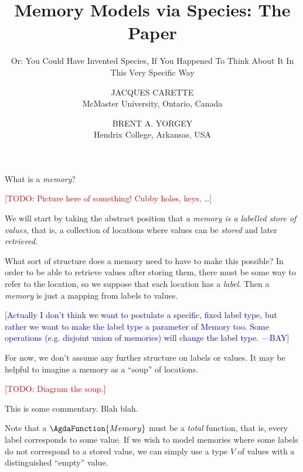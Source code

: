 \documentclass{jfp1}
\title{Memory Models via Species: The Paper}
\subtitle{Or: You Could Have Invented Species, If You Happened To Think
  About It In This Very Specific Way}
\author[J. Carette and B. A. Yorgey]{JACQUES CARETTE\\
  McMaster University, Ontario, Canada \\
  \email{carette@mcmaster.ca}
  \and BRENT A. YORGEY\\
  Hendrix College, Arkansas, USA\\
  \email{yorgey@hendrix.edu}}
\newcommand{\term}[1]{\emph{#1}}
\newcommand{\authornote}[3]{\textcolor{#1}{[#3 ---#2]}}
\newcommand{\todo}[1]{\textcolor{red}{[TODO: #1]}}
\newcommand{\authornote}[3]{}
\newcommand{\todo}[1]{}
\newcommand{\bay}[1]{\authornote{blue}{BAY}{#1}}
\begin{document}
\maketitle

What is a \term{memory}?

\todo{Picture here of something! Cubby holes, keys, \dots}

We will start by taking the abstract position that \emph{a memory is a
 labelled store of values}, that is, a collection of locations where values 
can be \emph{stored} and later \emph{retrieved}.

What sort of structure does a memory need to have to make this
possible?  In order to be able to retrieve values after storing them,
there must be some way to refer to the location, so we
suppose that each location has a \emph{label}.  Then a \term{memory}
is just a mapping from labels to values.


\bay{Actually I don't think we want to postulate a specific, fixed
  label type, but rather we want to make the label type a parameter of
  Memory too.  Some operations (e.g. disjoint union of memories) will
  change the label type.}

For now, we don't assume any further structure on labels or values.
It may be helpful to imagine a memory as a ``soup'' of locations.

\todo{Diagram the soup.}

\begin{commentary}
  This is some commentary.  Blah blah.
\end{commentary}

Note that a $\AgdaFunction{Memory}$ must be a \emph{total} function,
that is, every label corresponds to some value.  If we wish to model
memories where some labels do not correspond to a stored value, we can
simply use a type $V$ of values with a distinguished ``empty'' value.
\end{document}
